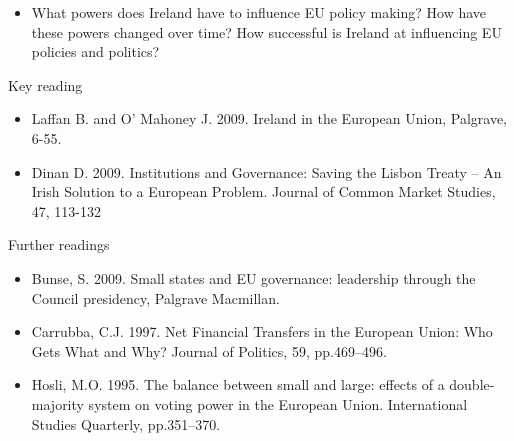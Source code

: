 \begin{itemize}
	\item What powers does Ireland have to influence EU policy making? How have these powers changed over time? How successful is Ireland at influencing EU policies and politics?
\end{itemize}

\noindent Key reading
	
\begin{itemize}
	\item Laffan B. and O’ Mahoney J. 2009. Ireland in the European Union, Palgrave, 6-55.
	\item Dinan D. 2009. Institutions and Governance: Saving the Lisbon Treaty – An Irish Solution to a European Problem. Journal of Common Market Studies, 47, 113-132
\end{itemize}

\noindent Further readings

\begin{itemize}
	\item Bunse, S. 2009. Small states and EU governance: leadership through the Council presidency, Palgrave Macmillan.
	\item Carrubba, C.J. 1997. Net Financial Transfers in the European Union: Who Gets What and Why? Journal of Politics, 59, pp.469–496.
	\item Hosli, M.O. 1995. The balance between small and large: effects of a double-majority system on voting power in the European Union. International Studies Quarterly, pp.351–370.
\end{itemize}